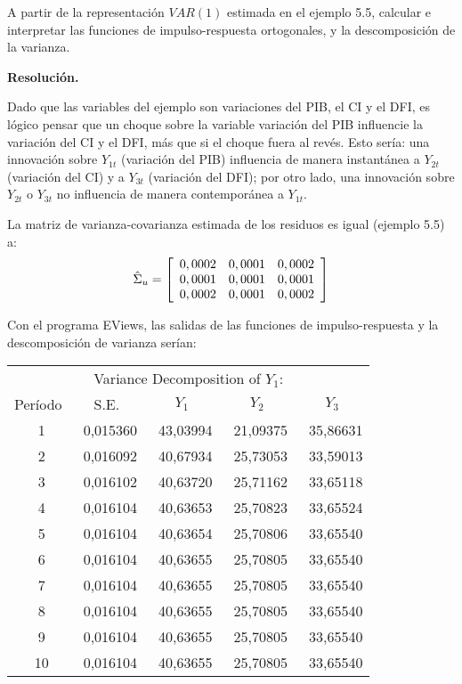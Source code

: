 \begin{enumerate}
\begin{ejemplo}
A partir de la representaci\'{o}n $VAR(1)$ estimada en el ejemplo 5.5, calcular e interpretar las funciones de impulso-respuesta ortogonales, y la descomposici\'{o}n de la varianza.
\end{ejemplo}

\textbf{Resoluci\'{o}n.}\newline

Dado que las variables del ejemplo son variaciones del PIB, el CI y el DFI, es l\'{o}gico pensar que un choque sobre la variable variaci\'{o}n del PIB influencie la variaci\'{o}n del CI y el DFI, m\'{a}s que si el choque fuera al rev\'{e}s. Esto ser\'{i}a: una innovaci\'{o}n sobre $Y_{1t}$ (variaci\'{o}n del PIB) influencia de manera instant\'{a}nea a $Y_{2t}$ (variaci\'{o}n del CI) y a $Y_{3t}$ (variaci\'{o}n del DFI); por otro lado, una innovaci\'{o}n sobre $Y_{2t}$ o $Y_{3t}$ no influencia de manera contempor\'{a}nea a $Y_{1t}$.

La matriz de varianza-covarianza estimada de los residuos es igual (ejemplo 5.5) a:
\[
\hat{\Sigma }_{u}=\left[ {\begin{array}{*{20}c}
0,0002 & 0,0001 & 0,0002\\
0,0001 & 0,0001 & 0,0001\\
0,0002 & 0,0001 & 0,0002\\
\end{array} } \right]
\]

Con el programa EViews, las salidas de las funciones de impulso-respuesta y la descomposici\'{o}n de varianza ser\'{i}an:

\begin{table}[H]
\centering
\begin{tabular}{ccccc}\hline\hline
\multicolumn{5}{c}{Variance Decomposition of $Y_{1}$:} \\ 
Per\'{i}odo & S.E. & $Y_{1}$ & $Y_{2}$ & $Y_{3}$ \\ \hline\hline
~1 & ~0,015360 & ~43,03994 & ~21,09375 & ~35,86631 \\
~2 & ~0,016092 & ~40,67934 & ~25,73053 & ~33,59013 \\
~3 & ~0,016102 & ~40,63720 & ~25,71162 & ~33,65118 \\
~4 & ~0,016104 & ~40,63653 & ~25,70823 & ~33,65524 \\
~5 & ~0,016104 & ~40,63654 & ~25,70806 & ~33,65540 \\
~6 & ~0,016104 & ~40,63655 & ~25,70805 & ~33,65540 \\
~7 & ~0,016104 & ~40,63655 & ~25,70805 & ~33,65540 \\
~8 & ~0,016104 & ~40,63655 & ~25,70805 & ~33,65540 \\ 
~9 & ~0,016104 & ~40,63655 & ~25,70805 & ~33,65540 \\
~10& ~0,016104 & ~40,63655 & ~25,70805 & ~33,65540 \\ \hline\hline
\end{tabular}
\end{table}


\end{enumerate}
